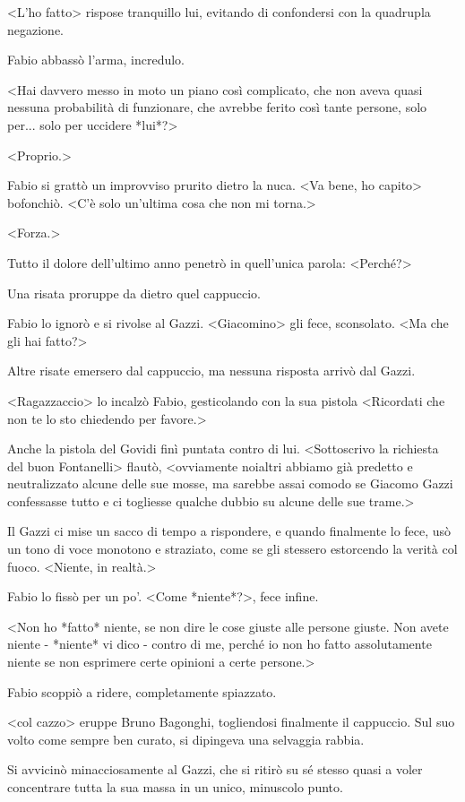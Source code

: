 <L'ho fatto> rispose tranquillo lui, evitando di confondersi con la quadrupla negazione.

Fabio abbassò l'arma, incredulo.

<Hai davvero messo in moto un piano così complicato, che non aveva quasi nessuna probabilità di funzionare, che avrebbe ferito così tante persone, solo per... solo per uccidere *lui*?>

<Proprio.>

Fabio si grattò un improvviso prurito dietro la nuca. <Va bene, ho capito> bofonchiò. <C'è solo un'ultima cosa che non mi torna.>

<Forza.>

Tutto il dolore dell'ultimo anno penetrò in quell'unica parola: <Perché?>

Una risata proruppe da dietro quel cappuccio.

Fabio lo ignorò e si rivolse al Gazzi. <Giacomino> gli fece, sconsolato. <Ma che gli hai fatto?>

Altre risate emersero dal cappuccio, ma nessuna risposta arrivò dal Gazzi.

<Ragazzaccio> lo incalzò Fabio, gesticolando con la sua pistola <Ricordati che non te lo sto chiedendo per favore.>

Anche la pistola del Govidi finì puntata contro di lui. <Sottoscrivo la richiesta del buon Fontanelli> flautò, <ovviamente noialtri abbiamo già predetto e neutralizzato alcune delle sue mosse, ma sarebbe assai comodo se Giacomo Gazzi confessasse tutto e ci togliesse qualche dubbio su alcune delle sue trame.>

Il Gazzi ci mise un sacco di tempo a rispondere, e quando finalmente lo fece, usò un tono di voce monotono e straziato, come se gli stessero estorcendo la verità col fuoco. <Niente, in realtà.>

Fabio lo fissò per un po'. <Come *niente*?>, fece infine.

<Non ho *fatto* niente, se non dire le cose giuste alle persone giuste. Non avete niente - *niente* vi dico - contro di me, perché io non ho fatto assolutamente niente se non esprimere certe opinioni a certe persone.>

Fabio scoppiò a ridere, completamente spiazzato.

<col cazzo> eruppe Bruno Bagonghi, togliendosi finalmente il cappuccio. Sul suo volto come sempre ben curato, si dipingeva una selvaggia rabbia.

Si avvicinò minacciosamente al Gazzi, che si ritirò su sé stesso quasi a voler concentrare tutta la sua massa in un unico, minuscolo punto.

